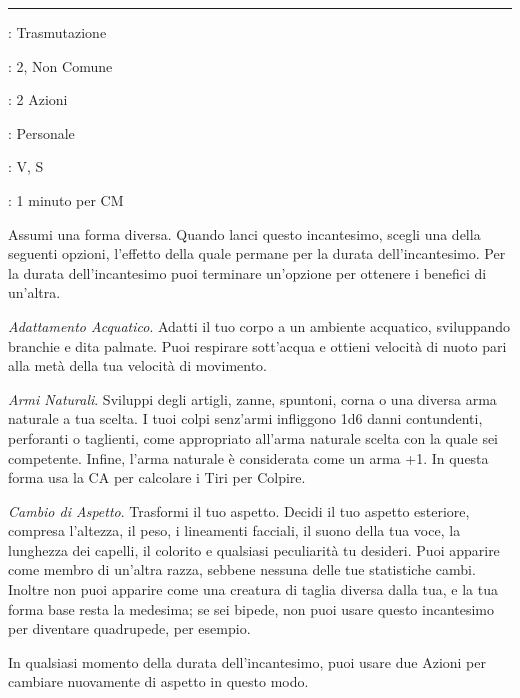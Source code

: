 \begin{multicols}{2}
\smallskip\noindent\rule{\linewidth}{2pt} \hypertarget{Alterare Sé Stesso}{}\smallskip{}\label{Alter Self}
\noindent
\begin{description}[noitemsep, topsep=0pt, parsep=0pt, partopsep=0pt, leftmargin=0cm, labelwidth=2.8cm, labelsep=0.2cm]
\item[\textbf{Lista di Magia}]: Trasmutazione
\item[\textbf{Livello}]: 2, Non Comune
\item[\textbf{T. di Lancio}]: 2 Azioni
\item[\textbf{Gittata}]: Personale
\item[\textbf{Componenti}]: V, S
\item[\textbf{Durata}]: 1 minuto per CM
\end{description}

Assumi una forma diversa. Quando lanci questo incantesimo, scegli una della seguenti opzioni, l'effetto della quale permane per la durata dell'incantesimo. Per la durata dell'incantesimo puoi terminare un'opzione per ottenere i benefici di un'altra.

\emph{Adattamento Acquatico}. Adatti il tuo corpo a un ambiente acquatico, sviluppando branchie e dita palmate. Puoi respirare sott'acqua e ottieni velocità di nuoto pari alla metà della tua velocità di movimento.

\emph{Armi Naturali}. Sviluppi degli artigli, zanne, spuntoni, corna o una diversa arma naturale a tua scelta. I tuoi colpi senz'armi infliggono 1d6 danni contundenti, perforanti o taglienti, come appropriato all'arma naturale scelta con la quale sei competente. Infine, l'arma naturale è considerata come un arma +1. In questa forma usa la CA per calcolare i Tiri per Colpire.

\emph{Cambio di Aspetto}. Trasformi il tuo aspetto. Decidi il tuo aspetto esteriore, compresa l'altezza, il peso, i lineamenti facciali, il suono della tua voce, la lunghezza dei capelli, il colorito e qualsiasi peculiarità tu desideri. Puoi apparire come membro di un'altra razza, sebbene nessuna delle tue statistiche cambi. Inoltre non puoi apparire come una creatura di taglia diversa dalla tua, e la tua forma base resta la medesima; se sei bipede, non puoi usare questo incantesimo per diventare quadrupede, per esempio.

In qualsiasi momento della durata dell'incantesimo, puoi usare due Azioni per cambiare nuovamente di aspetto in questo modo.


\end{multicols}
